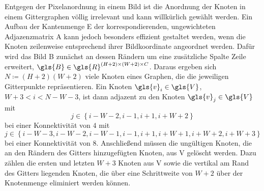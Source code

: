 Entgegen der Pixelanordnung in einem Bild ist die Anordnung der Knoten in einem Gittergraphen völlig irrelevant und kann willkürlich gewählt werden.
Ein Aufbau der Kantenmenge \gls{E} \bzw{} der korrespondierenden, ungewichteten Adjazenzmatrix \gls{A} kann jedoch besonders effizient gestaltet werden, wenn die Knoten zeilenweise entsprechend ihrer Bildkoordinate angeordnet werden.
Dafür wird das Bild \gls{B} zunächst an dessen Rändern um eine zusätzliche Spalte \bzw{} Zeile erweitert, \dhe{} $\gls{B} \in \gls{R}^{\left(H + 2\right) \times \left(W + 2\right) \times C}$.
Daraus ergeben sich $N \coloneqq \left(H + 2\right)\left(W + 2\right)$ viele Knoten eines Graphen, die die jeweiligen Gitterpunkte repräsentieren.
Ein Knoten $\gls{v}_i \in \gls{V}$, $W+3 < i < N - W - 3$, ist dann adjazent zu den Knoten $\gls{v}_j \in \gls{V}$ mit
\begin{equation*}
  j \in \left\{i-W-2, i-1, i+1, i+W+2\right\}
\end{equation*}
bei einer Konnektivität von $4$ \bzw{} mit
\begin{equation*}
  j \in \left\{i-W-3, i-W-2, i-W-1, i-1, i+1, i+W+1, i+W+2, i+W+3\right\}
\end{equation*}
bei einer Konnektivität von $8$.
Anschließend müssen die ungültigen Knoten, \dhe{} die an den Rändern des Gitters hinzugefügten Knoten, aus \gls{V} gelöscht werden.
Dazu zählen die ersten und letzten $W + 3$ Knoten aus \gls{V} sowie die vertikal am Rand des Gitters liegenden Knoten, die über eine Schrittweite von $W+2$ über der Knotenmenge eliminiert werden können.
